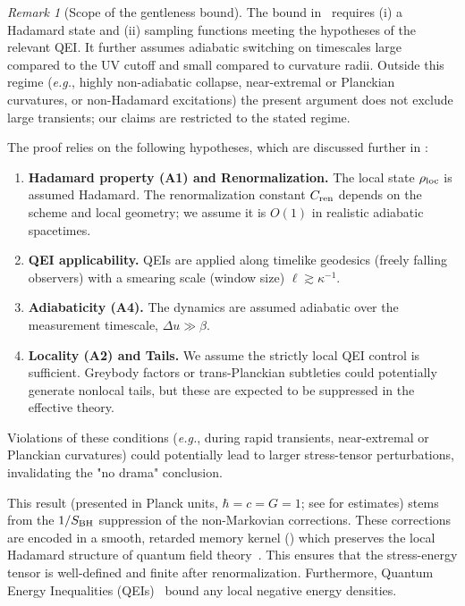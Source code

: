 \documentclass[aps,prd,preprint,onecolumn,superscriptaddress,nofootinbib,longbibliography,floatfix,11pt,showpacs,showkeys]{revtex4-2}
\newcommand{\eg}{\textit{e.g.}\xspace}
\theoremstyle{plain}
\theoremstyle{definition}
\theoremstyle{remark}
\newtheorem{remark}[theorem]{Remark}
\begin{document}
\begin{remark}[Scope of the gentleness bound]
The bound in~ requires (i) a Hadamard state and (ii) sampling functions meeting the hypotheses of the relevant QEI. It further assumes adiabatic switching on timescales large compared to the UV cutoff and small compared to curvature radii. Outside this regime (\eg, highly non-adiabatic collapse, near-extremal or Planckian curvatures, or non-Hadamard excitations) the present argument does not exclude large transients; our claims are restricted to the stated regime.

The proof relies on the following hypotheses, which are discussed further in :
\begin{enumerate}[label=(\roman*)]
    \item \textbf{Hadamard property (A1) and Renormalization.} The local state $\rho_{\rm loc}$ is assumed Hadamard. The renormalization constant $C_{\rm ren}$ depends on the scheme and local geometry; we assume it is $O(1)$ in realistic adiabatic spacetimes.
    \item \textbf{QEI applicability.} QEIs are applied along timelike geodesics (freely falling observers) with a smearing scale (window size) $\ell \gtrsim \kappa^{-1}$.
    \item \textbf{Adiabaticity (A4).} The dynamics are assumed adiabatic over the measurement timescale, $\Delta u \gg \beta$.
    \item \textbf{Locality (A2) and Tails.} We assume the strictly local QEI control is sufficient. Greybody factors or trans-Planckian subtleties could potentially generate nonlocal tails, but these are expected to be suppressed in the effective theory.
\end{enumerate}
Violations of these conditions (\eg, during rapid transients, near-extremal or Planckian curvatures) could potentially lead to larger stress-tensor perturbations, invalidating the "no drama" conclusion.
\end{remark}

This result (presented in Planck units, $\hbar=c=G=1$; see  for estimates) stems from the $1/S_{\rm BH}$ suppression of the non-Markovian corrections. These corrections are encoded in a smooth, retarded memory kernel () which preserves the local Hadamard structure of quantum field theory~\cite{Radzikowski:1996}. This ensures that the stress-energy tensor is well-defined and finite after renormalization. Furthermore, Quantum Energy Inequalities (QEIs)~\cite{Fewster:2012} bound any local negative energy densities.
\end{document}
